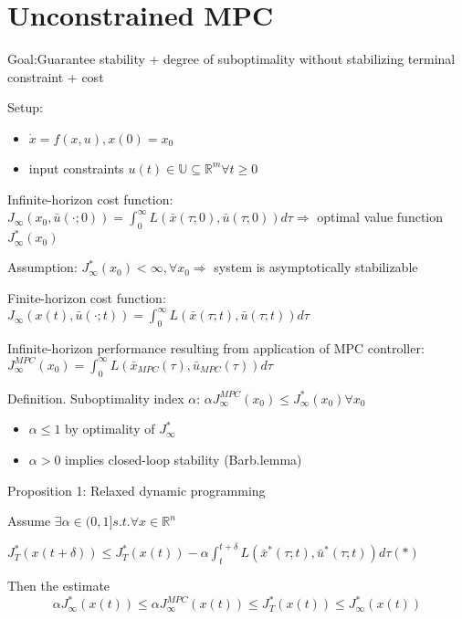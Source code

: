 \chapter{Unconstrained MPC}\label{chap3}

Goal:Guarantee stability + degree of suboptimality
without stabilizing terminal constraint + cost

Setup: 
\begin{itemize}
\item $\dot x = f(x,u), x(0)=x_0$
\item input constraints $u(t) \in \mathbb{U} \subseteq \mathbb{R}^m \forall t \geq 0$
\end{itemize}

Infinite-horizon cost function:
$J_{\infty}(x_0, \bar{u}(\cdot; 0)) = \int_{0}^{\infty}L(\bar x(\tau;0), \bar u(\tau;0))d\tau  \Rightarrow$ optimal value function $J_{\infty}^*(x_0)$

Assumption: $J^{*}_{\infty}(x_0) < \infty, \forall x_0 \Rightarrow$ system is asymptotically stabilizable

Finite-horizon cost function:
$J_{\infty}(x(t), \bar{u}(\cdot; t)) = \int_{0}^{\infty}L(\bar x(\tau;t), \bar u(\tau;t))d\tau$

Infinite-horizon performance resulting from application of MPC controller:
$J_{\infty}^{MPC}(x_0) = \int_{0}^{\infty}L(\bar x_{MPC}(\tau), \bar u_{MPC}(\tau))d\tau$

Definition. Suboptimality index $\alpha$:
$\alpha J_{\infty}^{MPC}(x_0) \leq J_{\infty}^{*}(x_0) \forall x_0$

\begin{itemize}
\item $\alpha \leq 1$ by optimality of $J^{*}_{\infty}$
\item $\alpha > 0$ implies closed-loop stability (Barb.lemma)
\end{itemize}

Proposition 1: Relaxed dynamic programming
 
Assume $\exists \alpha \in (0,1] s.t. \forall x \in \mathbb{R}^n$

$J_{T}^{*}(x(t+\delta)) \leq J_T^*(x(t)) - \alpha\int_{t}^{t+\delta}L(\bar x^*(\tau;t),\bar u^*(\tau;t))d\tau (*)$

Then the estimate 
\begin{equation}
\alpha J_{\infty}^*(x(t)) \leq \alpha J_{\infty}^{MPC}(x(t)) \leq J_T^*(x(t)) \leq J_{\infty}^*(x(t))
\end{equation}

